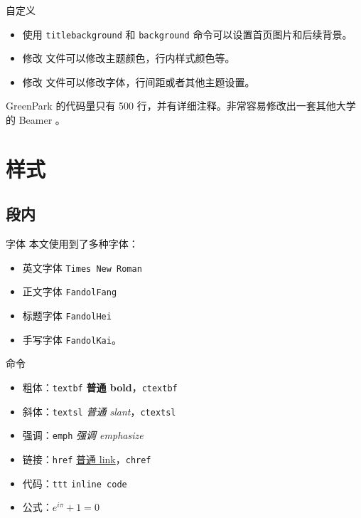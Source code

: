 \documentclass{ctexbeamer}
\begin{document}
\begin{frame}{自定义}
  \begin{itemize}
  \item 使用 \texttt{titlebackground} 和 \texttt{background}  命令可以设置首页图片和后续背景。
  \item 修改  文件可以修改主题颜色，行内样式颜色等。
  \item 修改  文件可以修改字体，行间距或者其他主题设置。
  \end{itemize}

  GreenPark 的代码量只有 500 行，并有详细注释。非常容易修改出一套其他大学的 Beamer 。
  
\end{frame}

\section{样式}
\subsection{段内}
\begin{frame}{字体}
  本文使用到了多种字体：
  \begin{itemize}
  \item 英文字体 \texttt{Times New Roman}
  \item 正文字体 \texttt{FandolFang}
  \item 标题字体 \texttt{FandolHei}
  \item 手写字体 \texttt{FandolKai}。
  \end{itemize}
\end{frame}

\begin{frame}{命令}
  \begin{itemize}
  \item 粗体：\texttt{textbf} \textbf{普通 bold}，\texttt{ctextbf} 
  \item 斜体：\texttt{textsl} \textsl{普通 slant}，\texttt{ctextsl} 
  \item 强调：\texttt{emph} \emph{强调 emphasize}
  \item 链接：\texttt{href} \href{https://thysrael.github.io/}{普通 link}，\texttt{chref} 
  \item 代码：\texttt{ttt} \texttt{inline code}
  \item 公式：\(e^{i\pi} + 1 = 0\)
  \end{itemize}
\end{frame}
\end{document}
